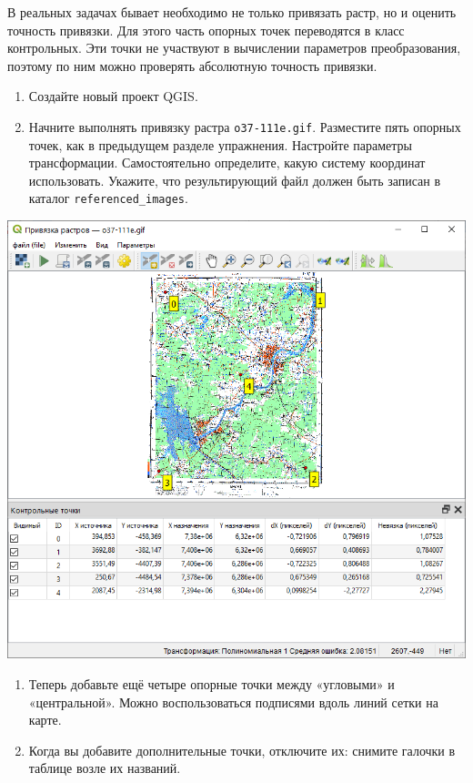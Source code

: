 \documentclass[
  12pt,
]{book}
\begin{document}
В реальных задачах бывает необходимо не только привязать растр, но и оценить точность привязки. Для этого часть опорных точек переводятся в класс контрольных. Эти точки не участвуют в вычислении параметров преобразования, поэтому по ним можно проверять абсолютную точность привязки.

\begin{enumerate}
\def\labelenumi{\arabic{enumi}.}
\item
  Создайте новый проект QGIS.
\item
  Начните выполнять привязку растра \texttt{o37-111e.gif}. Разместите пять опорных точек, как в предыдущем разделе упражнения. Настройте параметры трансформации. Самостоятельно определите, какую систему координат использовать. Укажите, что результирующий файл должен быть записан в каталог \texttt{referenced\_images}.
\end{enumerate}

\includegraphics{images/Ex05_Reference/RasterReference3.png}

\begin{enumerate}
\def\labelenumi{\arabic{enumi}.}
\setcounter{enumi}{3}
\item
  Теперь добавьте ещё четыре опорные точки между «угловыми» и «центральной». Можно воспользоваться подписями вдоль линий сетки на карте.
\item
  Когда вы добавите дополнительные точки, отключите их: снимите галочки в таблице возле их названий.
\end{enumerate}
\end{document}
